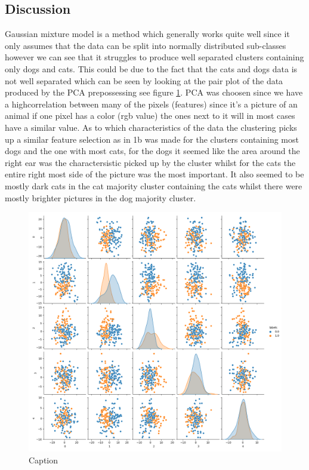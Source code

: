 \documentclass{article}
\begin{document}
\subsection{Discussion}
Gaussian mixture model is a method which generally works quite well since it only assumes that the data can be split into normally distributed sub-classes however we can see that it struggles to produce well separated clusters containing only dogs and cats. This could be due to the fact that the cats and dogs data is not well separated which can be seen by looking at the pair plot of the data produced by the PCA prepossessing see figure \ref{pca}. PCA was choosen since we have a highcorrelation between many of the pixels (features) since it's a picture of an animal if one pixel has a color (rgb value) the ones next to it will in most cases have a similar value. As to which characteristics of the data the clustering picks up a similar feature selection as in 1b was made for the clusters containing most dogs and the one with most cats, for the dogs it seemed like the area around the right ear was the charactersistic picked up by the cluster whilst for the cats the entire right most side of the picture was the most important. It also seemed to be mostly dark cats in the cat majority cluster containing the cats whilst there were mostly brighter pictures in the dog majority cluster.       
\begin{figure}[H]
    \centering
    \includegraphics[scale = 0.3]{1c/True labels sns.png}
    \caption{Caption}
    \label{pca}
\end{figure}
\end{document}
